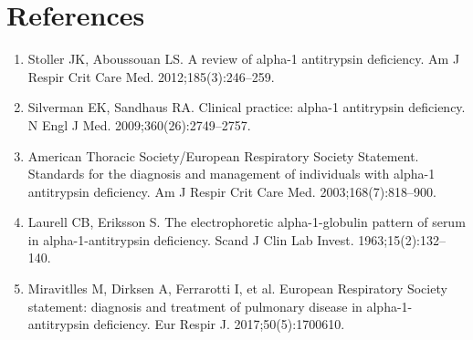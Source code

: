 \section*{References}
\begin{enumerate}
  \item Stoller JK, Aboussouan LS. A review of alpha-1 antitrypsin deficiency. Am J Respir Crit Care Med. 2012;185(3):246--259.
  \item Silverman EK, Sandhaus RA. Clinical practice: alpha-1 antitrypsin deficiency. N Engl J Med. 2009;360(26):2749--2757.
  \item American Thoracic Society/European Respiratory Society Statement. Standards for the diagnosis and management of individuals with alpha-1 antitrypsin deficiency. Am J Respir Crit Care Med. 2003;168(7):818--900.
  \item Laurell CB, Eriksson S. The electrophoretic alpha-1-globulin pattern of serum in alpha-1-antitrypsin deficiency. Scand J Clin Lab Invest. 1963;15(2):132--140.
  \item Miravitlles M, Dirksen A, Ferrarotti I, et al. European Respiratory Society statement: diagnosis and treatment of pulmonary disease in alpha-1-antitrypsin deficiency. Eur Respir J. 2017;50(5):1700610.
\end{enumerate}
\clearpage

